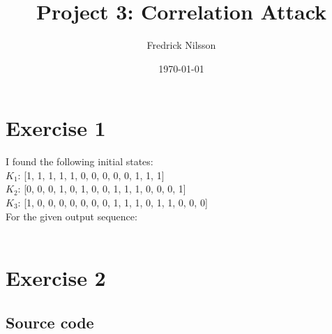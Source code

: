 \documentclass[12pt]{article}
\title{Project 3: Correlation Attack}
\author{Fredrick Nilsson}
\date{\today}
\begin{document}
\maketitle

\newpage

\section*{Exercise 1}
I found the following initial states: \\
\(K_1\): [1, 1, 1, 1, 1, 0, 0, 0, 0, 0, 1, 1, 1]\\
\(K_2\): [0, 0, 0, 1, 0, 1, 0, 0, 1, 1, 1, 0, 0, 0, 1]\\
\(K_3\): [1, 0, 0, 0, 0, 0, 0, 0, 1, 1, 1, 0, 1, 1, 0, 0, 0]\\
For the given output sequence: 
\\\\

\newpage

\section*{Exercise 2}

\subsection*{Source code}

\end{document}
